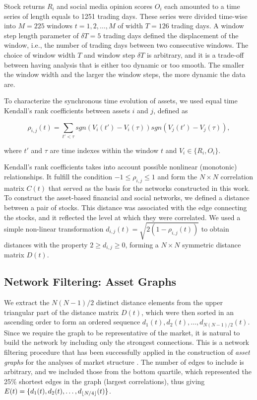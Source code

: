 \documentclass[]{book}
\theoremstyle{definition}
\theoremstyle{definition}
\theoremstyle{definition}
\theoremstyle{remark}
\begin{document}
Stock returns \(R_i\) and social media opinion scores \(O_i\) each
amounted to a time series of length equals to 1251 trading days. These
series were divided time-wise into \(M = 225\) windows
\(t = 1, 2, \ldots, M\) of width \(T = 126\) trading days. A window step
length parameter of \(\delta T = 5\) trading days defined the
displacement of the window, i.e., the number of trading days between two
consecutive windows. The choice of window width \(T\) and window step
\(\delta T\) is arbitrary, and it is a trade-off between having analysis
that is either too dynamic or too smooth. The smaller the window width
and the larger the window steps, the more dynamic the data are.

To characterize the synchronous time evolution of assets, we used equal
time Kendall's rank coefficients between assets \(i\) and \(j\), defined
as

\begin{equation}
 \rho_{i, j}(t) = \sum\limits_{t' < \tau}sgn(V_i(t') - V_i(\tau))sgn(V_j(t') - V_j(\tau)),
\end{equation}

where \(t'\) and \(\tau\) are time indexes within the window \(t\) and
\(V_i \in \{R_i, O_i\}\).

Kendall's rank coefficients takes into account possible nonlinear
(monotonic) relationships. It fulfill the condition
\(-1 \leq \rho_{i, j} \leq 1\) and form the \(N \times N\) correlation
matrix \(C(t)\) that served as the basis for the networks constructed in
this work. To construct the asset-based financial and social networks,
we defined a distance between a pair of stocks. This distance was
associated with the edge connecting the stocks, and it reflected the
level at which they were correlated. We used a simple non-linear
transformation \(d_{i, j}(t) = \sqrt{2(1 - \rho_{i,j}(t))}\) to obtain
distances with the property \(2 \geq d_{i,j} \geq 0\), forming a
\(N \times N\) symmetric distance matrix \(D(t)\).

\subsection{Network Filtering: Asset
Graphs}\label{network-filtering-asset-graphs}

We extract the \(N(N-1)/2\) distinct distance elements from the upper
triangular part of the distance matrix \(D(t)\), which were then sorted
in an ascending order to form an ordered sequence
\(d_1(t), d_2(t), \ldots, d_{N(N-1)/2}(t)\). Since we require the graph
to be representative of the market, it is natural to build the network
by including only the strongest connections. This is a network filtering
procedure that has been successfully applied in the construction of
\textit{asset graphs} for the analyses of market structure
\cite{1402-4896-2003-T106-011, refId0-Onnela-2004}. The number of edges
to include is arbitrary, and we included those from the bottom quartile,
which represented the 25\% shortest edges in the graph (largest
correlations), thus giving
\(E(t) = \{d_1(t), d_2(t), \ldots, d_{\lfloor N/4\rfloor}(t)\}\).
\end{document}
